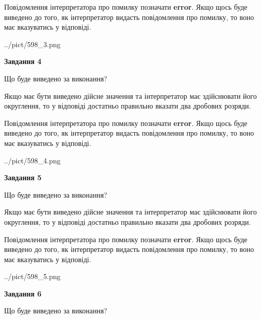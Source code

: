 \documentclass[12pt, ukrainian]{article}
\begin{document}
{\begin {Large}
Повідомлення інтерпретатора про помилку позначати \textbf{error}.
Якщо щось буде виведено до того, як інтерпретатор видасть повідомлення про помилку, 
то воно має вказуватись у відповіді. \par

\begin{center}
	{../pict/598_3.png}
\end{center}
\newpage

{\begin {center}\textbf{Завдання 4}\end {center}}\par
Що буде виведено за виконання? \par

Якщо має бути виведено дійсне значення та інтерпретатор має здійснювати його округлення, 
то у відповіді достатньо правильно вказати два дробових розряди.

Повідомлення інтерпретатора про помилку позначати \textbf{error}.
Якщо щось буде виведено до того, як інтерпретатор видасть повідомлення про помилку, 
то воно має вказуватись у відповіді. \par

\begin{center}
	{../pict/598_4.png}
\end{center}
\newpage

{\begin {center}\textbf{Завдання 5}\end {center}}\par
Що буде виведено за виконання? \par

Якщо має бути виведено дійсне значення та інтерпретатор має здійснювати його округлення, 
то у відповіді достатньо правильно вказати два дробових розряди.

Повідомлення інтерпретатора про помилку позначати \textbf{error}.
Якщо щось буде виведено до того, як інтерпретатор видасть повідомлення про помилку, 
то воно має вказуватись у відповіді. \par

\begin{center}
	{../pict/598_5.png}
\end{center}
\newpage

{\begin {center}\textbf{Завдання 6}\end {center}}\par
Що буде виведено за виконання? \par


\end{Large}}
\end{document}
